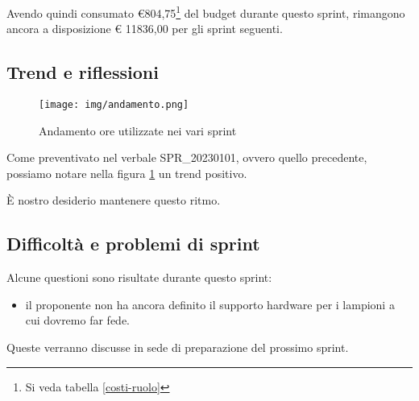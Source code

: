 Avendo quindi consumato €804,75\footnote{Si veda tabella \ref{costi-ruolo}} del budget durante questo sprint, rimangono ancora a disposizione € 11836,00 per gli sprint seguenti.

\subsection{Trend e riflessioni}

\begin{figure}[ht]
    \texttt{[image: img/andamento.png]}
    \caption{Andamento ore utilizzate nei vari sprint}\label{img:andamento}
\end{figure}

Come preventivato nel verbale SPR\_20230101, ovvero quello precedente, possiamo notare nella figura \ref{img:andamento} un trend positivo.

È nostro desiderio mantenere questo ritmo.

\subsection{Difficoltà e problemi di sprint}

Alcune questioni sono risultate durante questo sprint:

\begin{itemize}
    \item il proponente non ha ancora definito il supporto hardware per i lampioni a cui dovremo far fede.
\end{itemize}

Queste verranno discusse in sede di preparazione del prossimo sprint.
